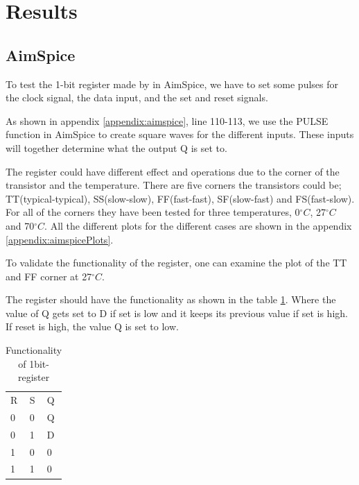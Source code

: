 \section{Results}
\label{sec:results}

\subsection{AimSpice}

To test the 1-bit register made by in AimSpice, we have to set some pulses for the clock signal, the data input, and the set and reset signals.

As shown in appendix \ref{appendix:aimspice}, line 110-113, we use the PULSE function in AimSpice to create square waves for the different inputs. These inputs will together determine what the output Q is set to. 

The register could have different effect and operations due to the corner of the transistor and the temperature. There are five corners the transistors could be; TT(typical-typical), SS(slow-slow), FF(fast-fast), SF(slow-fast) and FS(fast-slow). For all of the corners they have been tested for three temperatures, 0$^\circ C$, 27$^\circ C$ and 70$^\circ C$. All the different plots for the different cases are shown in the appendix \ref{appendix:aimspicePlots}. 

To validate the functionality of the register, one can examine the plot of the TT and FF corner at 27$^\circ C$. 

The register should have the functionality as shown in the table \ref{tab:registerFunc}. Where the value of Q gets set to D if set is low and it keeps its previous value if set is high. If reset is high, the value Q is set to low. 

\begin{table}[H]
\label{tab:registerFunc}
\centering
\caption{Functionality of 1bit-register}
\begin{tabular}{|l|l|l|}
\cline{1-3}
R & S & Q  \\ \cline{1-3}
0 & 0 & Q  \\ \cline{1-3}
0 & 1 & D  \\ \cline{1-3}
1 & 0 & 0  \\ \cline{1-3}
1 & 1 & 0  \\ \cline{1-3}
\end{tabular}
\end{table}


